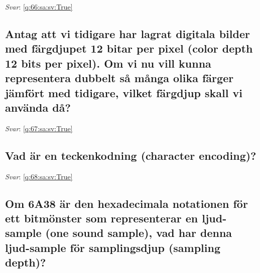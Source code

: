 \documentclass[a4paper,11pt,oneside]{article}
\begin{document}
\begin{sloppypar}
\label{q:66:sa:sv:False}

\vspace{2cm}

\noindent\makebox[\textwidth]{\hrulefill}

\vspace{1cm}

\textit{Svar}: \autoref{q:66:sa:sv:True}



\subsection{Antag att vi tidigare har lagrat digitala bilder med f\"argdjupet 12 bitar per pixel (color depth 12 bits per pixel). Om vi nu vill kunna representera dubbelt s\r{a} m\r{a}nga olika f\"arger j\"amf\"ort med tidigare, vilket f\"argdjup skall vi anv\"anda d\r{a}?}

\label{q:67:sa:sv:False}

\vspace{2cm}

\noindent\makebox[\textwidth]{\hrulefill}

\vspace{1cm}

\textit{Svar}: \autoref{q:67:sa:sv:True}



\subsection{Vad \"ar en teckenkodning (character encoding)?}

\label{q:68:sa:sv:False}

\vspace{2cm}

\noindent\makebox[\textwidth]{\hrulefill}

\vspace{1cm}

\textit{Svar}: \autoref{q:68:sa:sv:True}



\subsection{Om 6A38 \"ar den hexadecimala notationen f\"or ett bitm\"onster som representerar en ljud-sample (one sound sample), vad har denna ljud-sample f\"or samplingsdjup (sampling depth)?}

\label{q:71:sa:sv:False}

\vspace{2cm}


\end{sloppypar}
\end{document}
